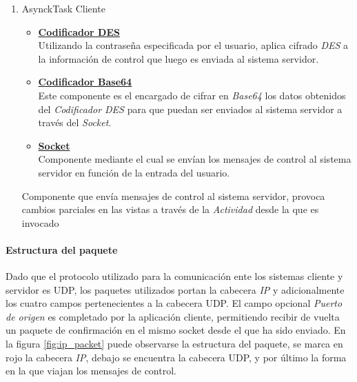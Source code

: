 \documentclass[12pt, twoside]{article}
\begin{document}
\begin{enumerate}
\begin{itemize}
                    \end{itemize}
                \item AsynckTask Cliente
                    \begin{itemize}
                        \item \textbf{\underline{Codificador DES}} \\
                            Utilizando la contraseña especificada por el usuario, aplica cifrado \textit{DES} a la información de control que luego es enviada al sistema servidor.
                        \item \textbf{\underline{Codificador Base64}} \\
                            Este componente es el encargado de cifrar en \textit{Base64} los datos obtenidos del \textit{Codificador DES} para que puedan ser enviados al sistema servidor a través del \textit{Socket}.
                        \item \textbf{\underline{Socket}} \\ 
                            Componente mediante el cual se envían los mensajes de control al sistema servidor en función de la entrada del usuario.
                    \end{itemize}
                    Componente que envía mensajes de control al sistema servidor, provoca cambios parciales en las vistas a través de la \textit{Actividad} desde la que es invocado
            \end{enumerate}

            \paragraph{ Estructura del paquete}
            Dado que el protocolo utilizado para la comunicación ente los sistemas cliente y servidor es UDP, los paquetes utilizados portan la cabecera \textit{IP} y adicionalmente los cuatro campos pertenecientes a la cabecera UDP. El campo opcional \textit{Puerto de origen} es completado por la aplicación cliente, permitiendo recibir de vuelta un paquete de confirmación en el mismo socket desde el que ha sido enviado. En la figura \ref{fig:ip_packet} puede observarse la estructura del paquete, se marca en rojo la cabecera \textit{IP}, debajo se encuentra la cabecera UDP, y por último la forma en la que viajan los mensajes de control.
\end{document}
